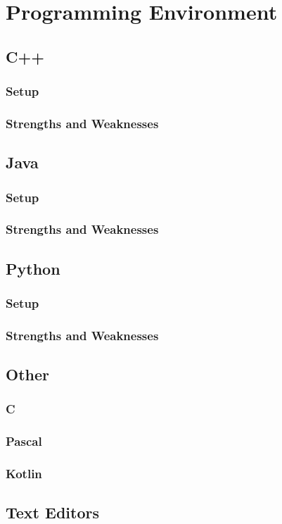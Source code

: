 \section{Programming Environment}
\subsection{C++}
\subsubsection{Setup}
\subsubsection{Strengths and Weaknesses}
\subsection{Java}
\subsubsection{Setup}
\subsubsection{Strengths and Weaknesses}
\subsection{Python}
\subsubsection{Setup}
\subsubsection{Strengths and Weaknesses}
\subsection{Other}
\subsubsection{C}
\subsubsection{Pascal}
\subsubsection{Kotlin}
\subsection{Text Editors}